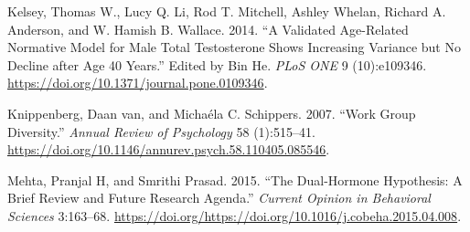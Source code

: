 \documentclass[]{article}
\begin{document}
\leavevmode\hypertarget{ref-Kelsey2014}{}%
Kelsey, Thomas W., Lucy Q. Li, Rod T. Mitchell, Ashley Whelan, Richard
A. Anderson, and W. Hamish B. Wallace. 2014. ``A Validated Age-Related
Normative Model for Male Total Testosterone Shows Increasing Variance
but No Decline after Age 40 Years.'' Edited by Bin He. \emph{PLoS ONE} 9
(10):e109346. \url{https://doi.org/10.1371/journal.pone.0109346}.

\leavevmode\hypertarget{ref-vanK}{}%
Knippenberg, Daan van, and Michaéla C. Schippers. 2007. ``Work Group
Diversity.'' \emph{Annual Review of Psychology} 58 (1):515--41.
\url{https://doi.org/10.1146/annurev.psych.58.110405.085546}.

\leavevmode\hypertarget{ref-MEHTA2015163}{}%
Mehta, Pranjal H, and Smrithi Prasad. 2015. ``The Dual-Hormone
Hypothesis: A Brief Review and Future Research Agenda.'' \emph{Current
Opinion in Behavioral Sciences} 3:163--68.
\url{https://doi.org/https://doi.org/10.1016/j.cobeha.2015.04.008}.
\end{document}
